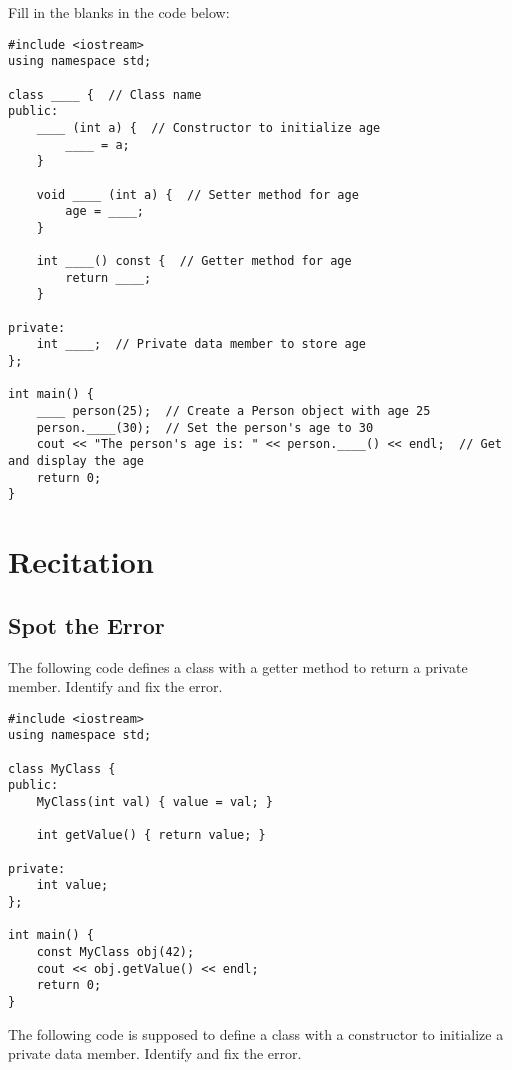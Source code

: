 \begin{problem}
Fill in the blanks in the code below:
\begin{verbatim}
#include <iostream>
using namespace std;

class ____ {  // Class name
public:
    ____ (int a) {  // Constructor to initialize age
        ____ = a;
    }
    
    void ____ (int a) {  // Setter method for age
        age = ____;
    }
    
    int ____() const {  // Getter method for age
        return ____;
    }

private:
    int ____;  // Private data member to store age
};

int main() {
    ____ person(25);  // Create a Person object with age 25
    person.____(30);  // Set the person's age to 30
    cout << "The person's age is: " << person.____() << endl;  // Get and display the age
    return 0;
}
\end{verbatim}
\end{problem}

\section{Recitation}
\subsection{Spot the Error}
\begin{multipart}
The following code defines a class with a getter method to return a private member. Identify and fix the error.
\end{multipart}

\begin{verbatim}
#include <iostream>
using namespace std;

class MyClass {
public:
    MyClass(int val) { value = val; }

    int getValue() { return value; }

private:
    int value;
};

int main() {
    const MyClass obj(42);
    cout << obj.getValue() << endl;
    return 0;
}
\end{verbatim}

\begin{multipart}
The following code is supposed to define a class with a constructor to initialize a private data member. Identify and fix the error.
\end{multipart}

